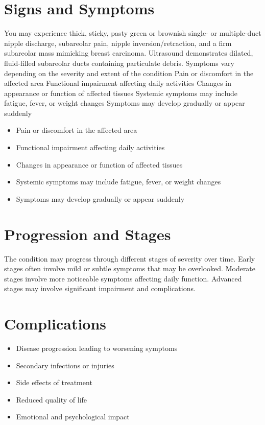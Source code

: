 \section{Signs and Symptoms}
You may experience thick, sticky, pasty green or brownish single- or multiple-duct nipple discharge, subareolar pain, nipple inversion/retraction, and a firm subareolar mass mimicking breast carcinoma. Ultrasound demonstrates dilated, fluid-filled subareolar ducts containing particulate debris. Symptoms vary depending on the severity and extent of the condition Pain or discomfort in the affected area Functional impairment affecting daily activities Changes in appearance or function of affected tissues Systemic symptoms may include fatigue, fever, or weight changes Symptoms may develop gradually or appear suddenly

\begin{itemize}[noitemsep]
  \item Pain or discomfort in the affected area
  \item Functional impairment affecting daily activities
  \item Changes in appearance or function of affected tissues
  \item Systemic symptoms may include fatigue, fever, or weight changes
  \item Symptoms may develop gradually or appear suddenly
\end{itemize}
\section{Progression and Stages}
The condition may progress through different stages of severity over time. Early stages often involve mild or subtle symptoms that may be overlooked. Moderate stages involve more noticeable symptoms affecting daily function. Advanced stages may involve significant impairment and complications.
\section{Complications}
\begin{itemize}[noitemsep]
  \item Disease progression leading to worsening symptoms
  \item Secondary infections or injuries
  \item Side effects of treatment
  \item Reduced quality of life
  \item Emotional and psychological impact
\end{itemize}
